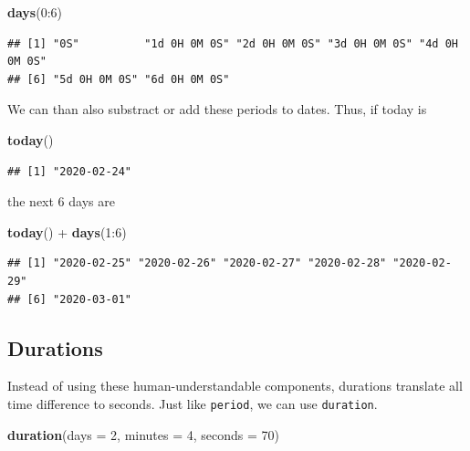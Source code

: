 \documentclass[]{tufte-book}
\newenvironment{Shaded}{}{}
\newcommand{\DataTypeTok}[1]{\textcolor[rgb]{0.56,0.13,0.00}{#1}}
\newcommand{\DecValTok}[1]{\textcolor[rgb]{0.25,0.63,0.44}{#1}}
\newcommand{\KeywordTok}[1]{\textcolor[rgb]{0.00,0.44,0.13}{\textbf{#1}}}
\newcommand{\NormalTok}[1]{#1}
\newcommand{\OperatorTok}[1]{\textcolor[rgb]{0.40,0.40,0.40}{#1}}
\newcommand{\StringTok}[1]{\textcolor[rgb]{0.25,0.44,0.63}{#1}}
\begin{document}
\begin{Shaded}
\begin{Highlighting}[]
\KeywordTok{days}\NormalTok{(}\DecValTok{0}\OperatorTok{:}\DecValTok{6}\NormalTok{)}
\end{Highlighting}
\end{Shaded}

\begin{verbatim}
## [1] "0S"          "1d 0H 0M 0S" "2d 0H 0M 0S" "3d 0H 0M 0S" "4d 0H 0M 0S"
## [6] "5d 0H 0M 0S" "6d 0H 0M 0S"
\end{verbatim}

We can than also substract or add these periods to dates. Thus, if today is

\begin{Shaded}
\begin{Highlighting}[]
\KeywordTok{today}\NormalTok{()}
\end{Highlighting}
\end{Shaded}

\begin{verbatim}
## [1] "2020-02-24"
\end{verbatim}

the next 6 days are

\begin{Shaded}
\begin{Highlighting}[]
\KeywordTok{today}\NormalTok{() }\OperatorTok{+}\StringTok{ }\KeywordTok{days}\NormalTok{(}\DecValTok{1}\OperatorTok{:}\DecValTok{6}\NormalTok{)}
\end{Highlighting}
\end{Shaded}

\begin{verbatim}
## [1] "2020-02-25" "2020-02-26" "2020-02-27" "2020-02-28" "2020-02-29"
## [6] "2020-03-01"
\end{verbatim}

\hypertarget{durations}{%
\subsection{Durations}\label{durations}}

Instead of using these human-understandable components, durations translate all time difference to seconds. Just like \texttt{period}, we can use \texttt{duration}.

\begin{Shaded}
\begin{Highlighting}[]
\KeywordTok{duration}\NormalTok{(}\DataTypeTok{days =} \DecValTok{2}\NormalTok{, }\DataTypeTok{minutes =} \DecValTok{4}\NormalTok{, }\DataTypeTok{seconds =} \DecValTok{70}\NormalTok{)}
\end{Highlighting}
\end{Shaded}
\end{document}
